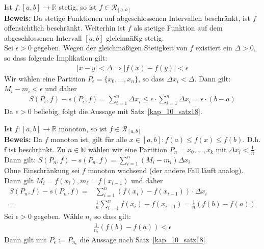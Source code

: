 \begin{Satz}{\label{kap10_satz20}
	Ist $f: [a,b] \rightarrow \mathbb{R}$ stetig, so ist 
	$ f \in \mathcal{R}_{[a,b]}$ \\
	\textbf{Beweis:} Da stetige Funktionen auf abgeschlossenen Intervallen 
	beschränkt, ist $f$ offensichtlich beschränkt. Weiterhin ist $f$ als stetige 
	Funktion auf dem abgeschlossenen Intervall $[a,b]$ gleichmäßig stetig. \\
	Sei $\epsilon > 0 $ gegeben. Wegen der gleichmäßigen Stetigkeit von $f$ 
	existiert ein $\Delta > 0$, so dass folgende Implikation gilt:
	\begin{align*}
		\vert x - y \vert < \Delta \Rightarrow \vert f(x) -f(y) \vert < \epsilon
	\end{align*}
	Wir wählen eine Partition $P_{\epsilon} = \{ x_0, \hdots, x_n \}$, so dass 
	$\Delta x_i < \Delta$. Dann gilt: $M_i - m_i < \epsilon$ und daher
	\begin{align*}
		S(P_{\epsilon},f) - s(P_{\epsilon},f) = \sum_{i = 1}^n \Delta x_i 
		\leq \epsilon \cdot \sum_{i = 1}^n \Delta x_i = \epsilon \cdot (b-a)
	\end{align*}
	Da $\epsilon > 0$ beliebig, folgt die Aussage mit Satz~\ref{kap_10_satz18}.
}\end{Satz}

\begin{Satz}{
	Ist $f: [a,b] \rightarrow \mathbb{R}$ monoton, so ist $f \in \mathcal{R}_{[a,b]}
	$\\
	\textbf{Beweis:} Da $f$ monoton ist, gilt für alle $x \in [a,b]: f(a) \leq f(x) 
	\leq f(b)$. D.h. f ist beschränkt. Zu $n \in \mathbb{N}$ wählen wir eine 
	Partition $P_n = {x_0, \hdots, x_k}$ mit $\Delta x_i < \frac{1}{n}$\\
	Dann gilt: $S(P_n, f) - s(P_n,f) = \sum_{i=1}^n (M_i - m_i)\Delta x_i$ \\
	Ohne Einschränkung sei $f$ monoton wachsend (der andere Fall läuft analog). \\
	Dann gilt $M_i = f(x_i), m_i = f(x_{i-1})$ und daher 
	\begin{align*}
		S(P_n, f) - s(P_n,f) = & \sum_{i=1}^n (f(x_i) -f(x_{i-1}))\cdot \Delta x_i 
		\\ = & \frac{1}{	n}\sum_{i=1}^n f(x_i) -f(x_{i-1}) = 
		\frac{1}{n} (f(b) -f(a)) 
	\end{align*}
	Sei $\epsilon > 0$ gegeben. Wähle $n_{\epsilon}$ so dass gilt:
	\begin{align*}
		\frac{1}{n_{\epsilon}}(f(b) -f(a)) < \epsilon
	\end{align*}
	Dann gilt mit $P_{\epsilon} := P_{n_{\epsilon}}$ die Aussage nach Satz~\ref{kap_10_satz18}
}\end{Satz}

